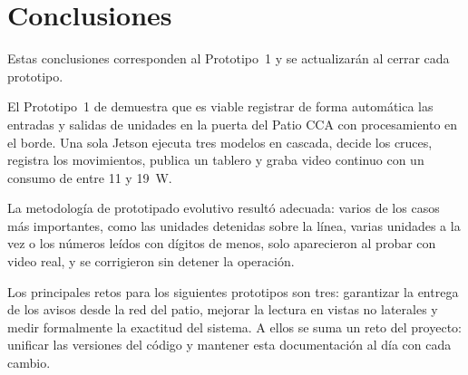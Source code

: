 \chapter{Conclusiones}
\label{cap:conclusiones}

\begin{nota}[title={Conclusiones preliminares}]
Estas conclusiones corresponden al Prototipo~1 y se actualizarán al cerrar
cada prototipo.
\end{nota}

El Prototipo~1 de \saru{} demuestra que es viable registrar de forma
automática las entradas y salidas de unidades en la puerta del Patio CCA
con procesamiento en el borde. Una sola Jetson ejecuta tres modelos en
cascada, decide los cruces, registra los movimientos, publica un tablero y
graba video continuo con un consumo de entre 11 y 19~W.

La metodología de prototipado evolutivo resultó adecuada: varios de los
casos más importantes, como las unidades detenidas sobre la línea, varias
unidades a la vez o los números leídos con dígitos de menos, solo
aparecieron al probar con video real, y se corrigieron sin detener la
operación.

Los principales retos para los siguientes prototipos son tres: garantizar
la entrega de los avisos desde la red del patio, mejorar la lectura en
vistas no laterales y medir formalmente la exactitud del sistema. A ellos
se suma un reto del proyecto: unificar las versiones del código y mantener
esta documentación al día con cada cambio.
